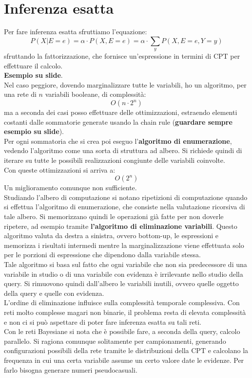 \documentclass[a4paper,12pt, oneside]{book}
\begin{document}
\section{Inferenza esatta}
Per fare inferenza esatta sfruttiamo l'equazione:
\[P(X|E=e)=\alpha\cdot P(X,E=e)=\alpha\cdot \sum_y P(X,E=e, Y=y)\]
sfruttando la fattorizzazione, che fornisce un'espressione in termini di CPT per
effettuare il calcolo.\\
\textbf{Esempio su slide}.\\
Nel caso peggiore, dovendo marginalizzare tutte le variabili, ho un algoritmo,
per una rete di $n$ variabili booleane, di complessità:
\[O(n\cdot 2^n)\]
ma a seconda dei casi posso effettuare delle ottimizzazioni, estraendo elementi
costanti dalle sommatorie generate usando la chain rule (\textbf{guardare sempre
  esempio su slide}).\\
Per ogni sommatoria che si crea poi eseguo l'\textbf{algoritmo di enumerazione},
vedendo l'algoritmo come una sorta di struttura ad albero. Si richiede quindi di
iterare su tutte le possibili realizzazioni congiunte delle variabili
coinvolte. \\
Con queste ottimizzazioni si arriva a:
\[O(2^n)\]
Un miglioramento comunque non sufficiente.\\
Studiando l'albero di computazione si notano ripetizioni di computazione quando
si effettua l'algoritmo di enumerazione, che consiste nella valutazione
ricorsiva di tale albero. Si memorizzano quindi le operazioni già fatte per non
doverle ripetere, ad esempio tramite \textbf{l'algoritmo di eliminazione
  variabili}. Questo algoritmo valuta da destra a sinistra, ovvero bottom-up, le
espressioni e memorizza i risultati intermedi mentre la marginalizzazione viene
effettuata solo per le porzioni di espressione che dipendono dalla variabile
stessa. \\
Tale algoritmo si basa sul fatto che ogni variabile che non sia predecessore di
una variabile in studio o di una variabile con evidenza è irrilevante nello
studio 
della query. Si rimuovono quindi dall'albero le variabili inutili, ovvero quelle
oggetto della query e quelle con evidenza. \\
L'ordine di eliminazione influisce sulla complessità temporale complessiva. Con
reti molto complesse magari non binarie, il problema resta di elevata
complessità e non ci si può aspettare di poter fare inferenza esatta su tali
reti. \\
Con le reti Bayesiane si nota che è possibile fare, a seconda della query,
calcolo parallelo. Si ragiona comunque solitamente per campionamenti, generando
configurazioni possibili della rete tramite le distribuzioni della CPT e
calcolano la frequenza in cui una certa variabile assume un certo valore date le
evidenze. Per farlo bisogna generare numeri pseudocasuali.
\end{document}
